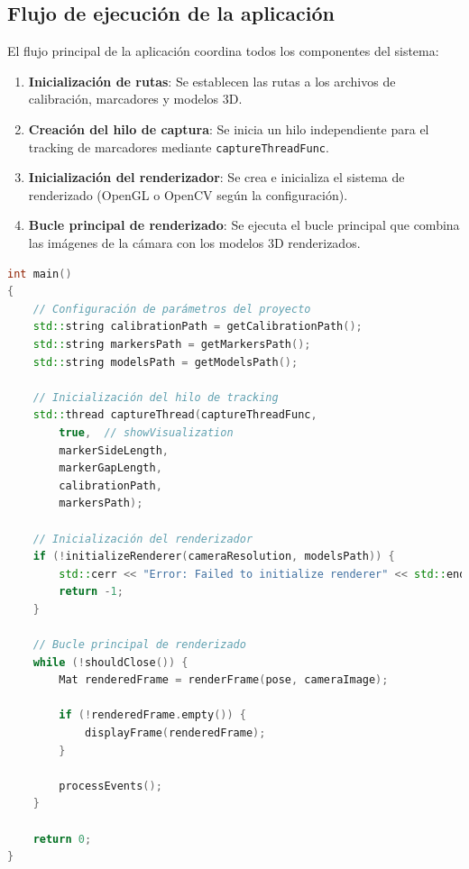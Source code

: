 \subsection{Flujo de ejecución de la aplicación}

El flujo principal de la aplicación coordina todos los componentes del sistema:

\begin{enumerate}
    \item \textbf{Inicialización de rutas}: Se establecen las rutas a los archivos de calibración, marcadores y modelos 3D.
    \item \textbf{Creación del hilo de captura}: Se inicia un hilo independiente para el \gls{tracking} de marcadores mediante \texttt{captureThreadFunc}.
    \item \textbf{Inicialización del renderizador}: Se crea e inicializa el sistema de renderizado (OpenGL o OpenCV según la configuración).
    \item \textbf{Bucle principal de renderizado}: Se ejecuta el bucle principal que combina las imágenes de la cámara con los modelos 3D renderizados.
\end{enumerate}

\begin{lstlisting}[language=C++]
int main()
{
    // Configuración de parámetros del proyecto
    std::string calibrationPath = getCalibrationPath();
    std::string markersPath = getMarkersPath();
    std::string modelsPath = getModelsPath();
    
    // Inicialización del hilo de tracking
    std::thread captureThread(captureThreadFunc, 
        true,  // showVisualization
        markerSideLength, 
        markerGapLength,
        calibrationPath,
        markersPath);
    
    // Inicialización del renderizador
    if (!initializeRenderer(cameraResolution, modelsPath)) {
        std::cerr << "Error: Failed to initialize renderer" << std::endl;
        return -1;
    }
    
    // Bucle principal de renderizado
    while (!shouldClose()) {
        Mat renderedFrame = renderFrame(pose, cameraImage);
        
        if (!renderedFrame.empty()) {
            displayFrame(renderedFrame);
        }
        
        processEvents();
    }
    
    return 0;
}
\end{lstlisting}

